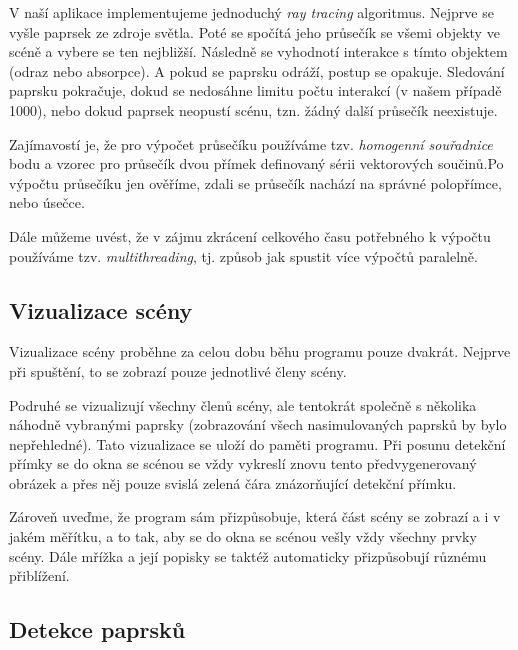 V naší aplikace implementujeme jednoduchý \emph{ray tracing} algoritmus. Nejprve se vyšle paprsek ze zdroje světla. Poté se spočítá jeho průsečík se všemi objekty ve scéně a vybere se ten nejbližší. Následně se vyhodnotí interakce s tímto objektem (odraz nebo absorpce). A pokud se paprsku odráží, postup se opakuje. Sledování paprsku pokračuje, dokud se nedosáhne limitu počtu interakcí (v našem případě 1000), nebo dokud paprsek neopustí scénu, tzn. žádný další průsečík neexistuje.

Zajímavostí je, že pro výpočet průsečíku používáme tzv. \emph{homogenní souřadnice} bodu a vzorec pro průsečík dvou přímek definovaný sérii vektorových součinů.\src Po výpočtu průsečíku jen ověříme, zdali se průsečík nachází na správné polopřímce, nebo úsečce.

Dále můžeme uvést, že v zájmu zkrácení celkového času potřebného k výpočtu používáme tzv. \emph{multithreading}, tj. způsob jak spustit více výpočtů paralelně.

\subsection{Vizualizace scény}

Vizualizace scény proběhne za celou dobu běhu programu pouze dvakrát. Nejprve při spuštění, to se zobrazí pouze jednotlivé členy scény.


Podruhé se vizualizují všechny členů scény, ale tentokrát společně s několika náhodně vybranými paprsky (zobrazování všech nasimulovaných paprsků by bylo nepřehledné). Tato vizualizace se uloží do paměti programu. Při posunu detekční přímky se do okna se scénou se vždy vykreslí znovu tento předvygenerovaný obrázek a přes něj pouze svislá zelená čára znázorňující detekční přímku.


Zároveň uveďme, že program sám přizpůsobuje, která část scény se zobrazí a i v jakém měřítku, a to tak, aby se do okna se scénou vešly vždy všechny prvky scény. Dále mřížka a její popisky se taktéž automaticky přizpůsobují různému přiblížení.


\subsection{Detekce paprsků}

